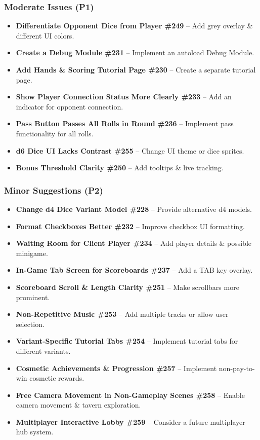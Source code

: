 \documentclass{article}
\begin{document}
\subsubsection{Moderate Issues (P1)}
\begin{itemize}
    \item \textbf{Differentiate Opponent Dice from Player \#249} – Add grey overlay \& different UI colors.
    \item \textbf{Create a Debug Module \#231} – Implement an autoload Debug Module.
    \item \textbf{Add Hands \& Scoring Tutorial Page \#230} – Create a separate tutorial page.
    \item \textbf{Show Player Connection Status More Clearly \#233} – Add an indicator for opponent connection.
    \item \textbf{Pass Button Passes All Rolls in Round \#236} – Implement pass functionality for all rolls.
    \item \textbf{d6 Dice UI Lacks Contrast \#255} – Change UI theme or dice sprites.
    \item \textbf{Bonus Threshold Clarity \#250} – Add tooltips \& live tracking.
\end{itemize}

\subsubsection{Minor Suggestions (P2)}
\begin{itemize}
    \item \textbf{Change d4 Dice Variant Model \#228} – Provide alternative d4 models.
    \item \textbf{Format Checkboxes Better \#232} – Improve checkbox UI formatting.
    \item \textbf{Waiting Room for Client Player \#234} – Add player details \& possible minigame.
    \item \textbf{In-Game Tab Screen for Scoreboards \#237} – Add a TAB key overlay.
    \item \textbf{Scoreboard Scroll \& Length Clarity \#251} – Make scrollbars more prominent.
    \item \textbf{Non-Repetitive Music \#253} – Add multiple tracks or allow user selection.
    \item \textbf{Variant-Specific Tutorial Tabs \#254} – Implement tutorial tabs for different variants.
    \item \textbf{Cosmetic Achievements \& Progression \#257} – Implement non-pay-to-win cosmetic rewards.
    \item \textbf{Free Camera Movement in Non-Gameplay Scenes \#258} – Enable camera movement \& tavern exploration.
    \item \textbf{Multiplayer Interactive Lobby \#259} – Consider a future multiplayer hub system.
\end{itemize}
\end{document}
